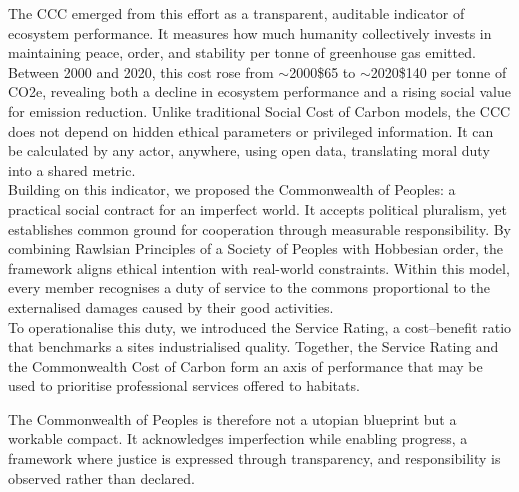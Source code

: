 \documentclass[10pt, oneside]{article}   	%
\begin{document}
The CCC emerged from this effort as a transparent, auditable indicator of ecosystem performance.
It measures how much humanity collectively invests in maintaining peace, order, and stability per tonne of greenhouse gas emitted.
Between 2000 and 2020, this cost rose from $\sim$2000\$65 to $\sim$2020\$140 per tonne of CO2e, revealing both a decline in ecosystem performance and a rising social value for emission reduction.
Unlike traditional Social Cost of Carbon models, the CCC does not depend on hidden ethical parameters or privileged information.
It can be calculated by any actor, anywhere, using open data, translating moral duty into a shared metric.\\

Building on this indicator, we proposed the Commonwealth of Peoples: a practical social contract for an imperfect world.
It accepts political pluralism, yet establishes common ground for cooperation through measurable responsibility.
By combining Rawlsian Principles of a Society of Peoples with Hobbesian order, the framework aligns ethical intention with real-world constraints.
Within this model, every member recognises a duty of service to the commons proportional to the externalised damages caused by their good activities.\\

To operationalise this duty, we introduced the Service Rating, a cost–benefit ratio that benchmarks a sites industrialised quality.
Together, the Service Rating and the Commonwealth Cost of Carbon form an axis of performance that may be used to prioritise professional services offered to habitats.

The Commonwealth of Peoples is therefore not a utopian blueprint but a workable compact.
It acknowledges imperfection while enabling progress, a framework where justice is expressed through transparency, and responsibility is observed rather than declared.\\

 

\end{document}
